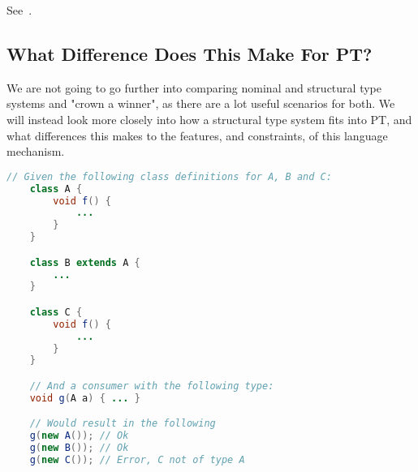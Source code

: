 See~\cite{malayeri}.

\subsection{What Difference Does This Make For PT?}\label{subsec:what-difference-does-this-make-for-pt?}

We are not going to go further into comparing nominal and structural type systems and "crown a winner", as there are a lot useful scenarios for both.
We will instead look more closely into how a structural type system fits into PT, and what differences this makes to the features, and constraints, of this language mechanism.

%
%
%
%
%




\begin{lstlisting}[label={lst:nominal-typing-example}, language=Java]
    // Given the following class definitions for A, B and C:
    class A {
        void f() {
            ...
        }
    }

    class B extends A {
        ...
    }

    class C {
        void f() {
            ...
        }
    }

    // And a consumer with the following type:
    void g(A a) { ... }

    // Would result in the following
    g(new A()); // Ok
    g(new B()); // Ok
    g(new C()); // Error, C not of type A
\end{lstlisting}


